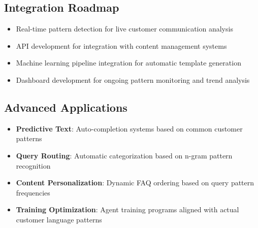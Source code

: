 \documentclass[11pt]{article}
\begin{document}
\subsection{Integration Roadmap}
\begin{itemize}
\item Real-time pattern detection for live customer communication analysis
\item API development for integration with content management systems
\item Machine learning pipeline integration for automatic template generation
\item Dashboard development for ongoing pattern monitoring and trend analysis
\end{itemize}

\subsection{Advanced Applications}
\begin{itemize}
\item \textbf{Predictive Text}: Auto-completion systems based on common customer patterns
\item \textbf{Query Routing}: Automatic categorization based on n-gram pattern recognition
\item \textbf{Content Personalization}: Dynamic FAQ ordering based on query pattern frequencies
\item \textbf{Training Optimization}: Agent training programs aligned with actual customer language patterns
\end{itemize}
\end{document}
